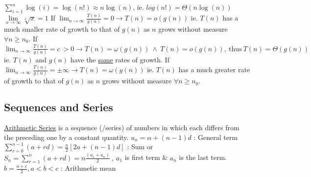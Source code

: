 \documentclass[12pt]{article}
\begin{document}
\begin{flushleft}
	\textbullet \quad $\displaystyle \sum\limits_{i=1}^n \log(i) = \log (n!) \approx n \log (n) $, ie. $\displaystyle log(n!) = \Theta (n\log (n))$ \linebreak 
	\textbullet \quad $\displaystyle \lim \limits_{x\to \infty} \sqrt[x]{x} = 1$ \linebreak 
	\textbullet \quad If $\displaystyle \lim_{n\to \infty} \frac{T(n)}{g(n)} = 0 \rightarrow T(n) = o \left( g(n) \right) $ \linebreak 
	ie. $T(n)$ has a much smaller rate of growth to that of $g(n)$ as $n$ grows without measure $\forall n \geq n_0 $. \linebreak 
	\textbullet \quad If $\displaystyle \lim_{n\to \infty} \frac{T(n)}{g(n)} = c \ > 0 \rightarrow T(n) = \omega \left( g(n) \right) \ \land \ T(n) = o \left( g(n) \right) , \ \text{thus} \ T(n) = \Theta \left( g(n) \right) $ \linebreak 
	ie. $T(n)$ and $g(n)$ have the \uline{same} rates of growth. \linebreak 
	\textbullet \quad If $\displaystyle \lim_{n\to \infty} \frac{T(n)}{g(n)} = \pm \infty \rightarrow T(n) = \omega \left( g(n) \right) $ \linebreak 
	ie. $T(n)$ has a much greater rate of growth to that of $g(n)$ as $n$ grows without measure $\forall n \geq n_0 $. \linebreak 	
	
	\subsection{Sequences and Series}
	
	\textbullet \quad \uline{Arithmetic Series} is a sequence (/series) of numbers in which each differs from the preceding one by a constant quantity. \linebreak 
	\textbullet \quad $u_n = \alpha + (n-1) d$  :  General term \linebreak 
	\textbullet \quad $\displaystyle \sum \limits_{r=0}^{n-1} (a+rd) = \frac{n}{2}\left[2a+(n-1)d \right] $  :  Sum \linebreak 
	or $S_n = \displaystyle \sum \limits_{r=1}^n \left(a+rd\right) = n \frac{(a_1+a_n)}{2}\ , \ a_1 $ is first term \& $a_n$ is the last term. \linebreak 
	\textbullet \quad $b = \frac{a + c}{2} , a < b < c$  :  Arithmetic mean \linebreak 
	

\end{flushleft}
\end{document}

